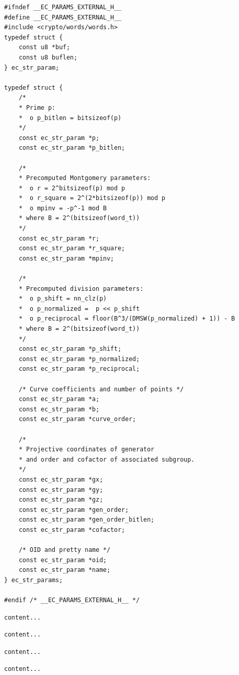 \documentclass[11pt,a4paper]{report}
\theoremstyle{definitionstyle}
\begin{document}
\begin{lstlisting}[style=cstyle, caption={ec\_params\_external.h}, captionpos=t]
#ifndef __EC_PARAMS_EXTERNAL_H__
#define __EC_PARAMS_EXTERNAL_H__
#include <crypto/words/words.h>
typedef struct {
	const u8 *buf;
	const u8 buflen;
} ec_str_param;

typedef struct {
	/*
	* Prime p:
	*  o p_bitlen = bitsizeof(p)
	*/
	const ec_str_param *p;
	const ec_str_param *p_bitlen;
	
	/*
	* Precomputed Montgomery parameters:
	*  o r = 2^bitsizeof(p) mod p
	*  o r_square = 2^(2*bitsizeof(p)) mod p
	*  o mpinv = -p^-1 mod B
	* where B = 2^(bitsizeof(word_t))
	*/
	const ec_str_param *r;
	const ec_str_param *r_square;
	const ec_str_param *mpinv;
	
	/*
	* Precomputed division parameters:
	*  o p_shift = nn_clz(p)
	*  o p_normalized =  p << p_shift
	*  o p_reciprocal = floor(B^3/(DMSW(p_normalized) + 1)) - B
	* where B = 2^(bitsizeof(word_t))
	*/
	const ec_str_param *p_shift;
	const ec_str_param *p_normalized;
	const ec_str_param *p_reciprocal;
	
	/* Curve coefficients and number of points */
	const ec_str_param *a;
	const ec_str_param *b;
	const ec_str_param *curve_order;
	
	/*
	* Projective coordinates of generator
	* and order and cofactor of associated subgroup.
	*/
	const ec_str_param *gx;
	const ec_str_param *gy;
	const ec_str_param *gz;
	const ec_str_param *gen_order;
	const ec_str_param *gen_order_bitlen;
	const ec_str_param *cofactor;
	
	/* OID and pretty name */
	const ec_str_param *oid;
	const ec_str_param *name;
} ec_str_params;

#endif /* __EC_PARAMS_EXTERNAL_H__ */
\end{lstlisting}
\begin{lstlisting}[style=cstyle]
content...
\end{lstlisting}
\begin{lstlisting}[style=cstyle]
content...
\end{lstlisting}
\begin{lstlisting}[style=cstyle]
content...
\end{lstlisting}
\begin{lstlisting}[style=cstyle]
content...
\end{lstlisting}

\newpage
\end{document}
